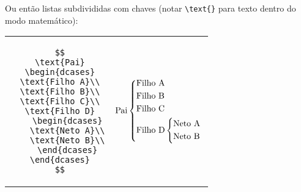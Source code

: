 \documentclass{scrartcl}
\begin{document}
 Ou então listas subdivididas com chaves (notar \verb+\text{}+ para texto dentro do modo matemático):
 
\begin{center}
  \begin{tabular}{cc}
 \begin{minipage}{0.3\textwidth}
\begin{verbatim}
 $$
 \text{Pai}
 \begin{dcases}
 \text{Filho A}\\
 \text{Filho B}\\
 \text{Filho C}\\
 \text{Filho D}
    \begin{dcases}
    \text{Neto A}\\
    \text{Neto B}\\
    \end{dcases}
 \end{dcases}
 $$
\end{verbatim}
\end{minipage}
&

\begin{minipage}{0.3\textwidth}
 $$
 \text{Pai}
 \begin{dcases}
 \text{Filho A}\\
 \text{Filho B}\\
 \text{Filho C}\\
 \text{Filho D}
    \begin{dcases}
    \text{Neto A}\\
    \text{Neto B}\\
    \end{dcases}
 \end{dcases}
 $$
\end{minipage}
 \end{tabular}
\end{center}
 
 
\end{document}
